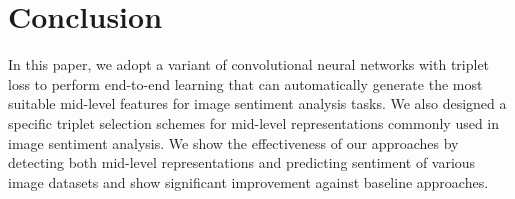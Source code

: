 \section{Conclusion}
\label{conclusion}

In this paper, we adopt a variant of convolutional neural networks with triplet loss to perform end-to-end learning that can automatically generate the most suitable mid-level features for image sentiment analysis tasks. We also designed a specific triplet selection schemes for mid-level representations commonly used in image sentiment analysis. We show the effectiveness of our approaches by detecting both mid-level representations and predicting sentiment of various image datasets and show significant improvement against baseline approaches.
